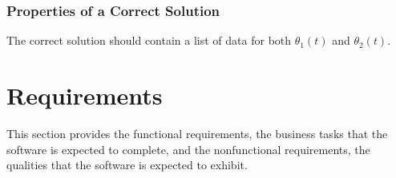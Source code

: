 \documentclass[12pt]{article}
\begin{document}
\subsubsection{Properties of a Correct Solution}\label{sec_corSol}
The correct solution should contain a list of data for both $\theta_1(t)$ and $\theta_2(t)$. 

\section{Requirements}\label{sec_req}
This section provides the functional requirements, the business tasks that the
software is expected to complete, and the nonfunctional requirements, the
qualities that the software is expected to exhibit.
\end{document}
